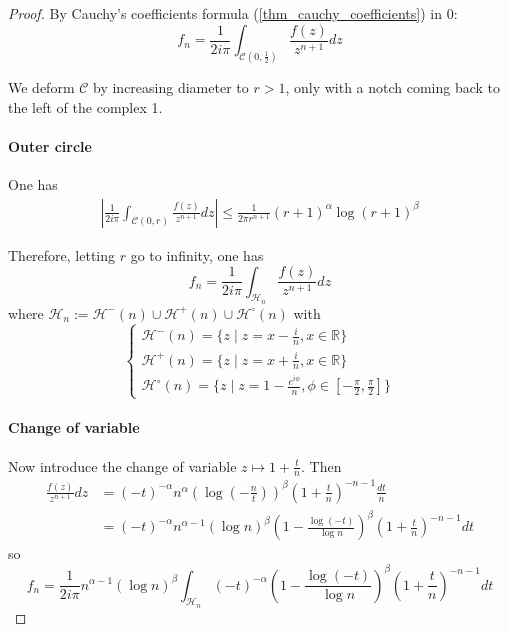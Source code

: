 \documentclass[../main.tex]{subfiles}
\begin{document}
\begin{proof}
	By Cauchy's coefficients formula (\ref{thm_cauchy_coefficients}) in 0:
	\[
	f_n = \frac{1}{2i\pi} \int_{\mathcal{C} \left(0, \frac{1}{2}\right)} \frac{f(z)}{z^{n+1}} dz
	\]
	
	We deform $\mathcal{C}$ by increasing diameter to $r > 1$, only with a notch coming back to the left of the complex 1.
	
	
	\paragraph{Outer circle}
	One has
	\begin{align*}
		\left| \frac{1}{2i\pi} \int_{\mathcal{C}(0, r)} \frac{f(z)}{z^{n+1}} dz \right| \leq
		\frac{1}{2 \pi r^{n + 1}} {(r + 1)}^\alpha {\log (r + 1)}^\beta
	\end{align*}
	
	Therefore, letting $r$ go to infinity, one has
	\[
	f_n = \frac{1}{2i\pi} \int_{\mathcal{H}_n} \frac{f(z)}{z^{n+1}} dz
	\]
	where $\mathcal{H}_n := \mathcal{H}^-(n) \cup \mathcal{H}^+(n) \cup \mathcal{H}^\circ(n)$ with
	\begin{equation*}
		\begin{cases}
		\mathcal{H}^-(n) = \{z \mid z = x - \frac{i}{n}, x \in \mathbb{R} \}\\
		\mathcal{H}^+(n) = \{z \mid z = x + \frac{i}{n}, x \in \mathbb{R} \}\\
		\mathcal{H}^\circ(n) = \{z \mid z = 1 - \frac{e^{i \phi}}{n}, \phi \in [ - \frac{\pi}{2}, \frac{\pi}{2} ] \}
		\end{cases}
	\end{equation*}
	
	\paragraph{Change of variable}	
	Now introduce the change of variable $z \mapsto 1 + \frac{t}{n}$.
	Then
	\begin{align*}
	\frac{f(z)}{z^{n+1}} dz
	&= {(-t)}^{-\alpha} n^\alpha {\left( \log \left( - \frac{n}{t} \right) \right) }^\beta {\left( 1 + \frac{t}{n} \right)}^{-n-1} \frac{dt}{n}\\
	&= {(-t)}^{-\alpha} n^{\alpha-1} {(\log n)}^\beta {\left( 1 - \frac{\log (-t)}{\log n} \right)}^\beta  {\left( 1 + \frac{t}{n} \right)}^{-n-1} dt
	\end{align*}
	so
	\begin{equation*}
		f_n = \frac{1}{2i\pi} n^{\alpha - 1} {(\log n)}^\beta
		  \int_{\mathcal{H}_n} {(-t)}^{-\alpha} {\left( 1 - \frac{\log (-t)}{\log n} \right)}^\beta  {\left( 1 + \frac{t}{n} \right)}^{-n-1} dt
	\end{equation*}


\end{proof}
\end{document}
